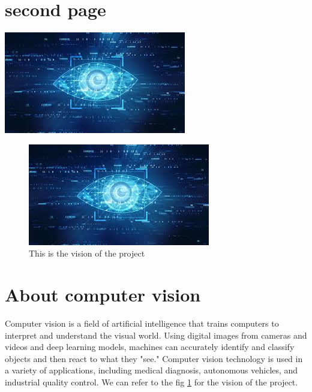 \documentclass{article}
\begin{document}
\newpage
\section{second page}
\thispagestyle{style}


\begin{center}
\includegraphics[scale=0.5]{vision.jpg}
\end{center}
\begin{figure}[h]
    \centering
    \includegraphics[scale=0.5]{vision.jpg}
    \caption{This is the vision of the project}
    \label{fig:vision}
\end{figure}
\section{About computer vision}
Computer vision is a field of artificial intelligence that trains computers to interpret and understand the visual world. Using digital images from cameras and videos and deep learning models, machines can accurately identify and classify objects and then react to what they "see." Computer vision technology is used in a variety of applications, including medical diagnosis, autonomous vehicles, and industrial quality control.
We can refer to the fig \ref{fig:vision} for the vision of the project.\\
\end{document}
